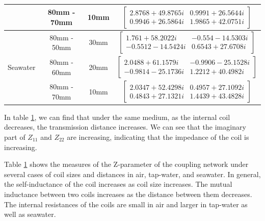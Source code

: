 \begin{table}[!t]
{\begin{tabular}{|c|c|c|c|}
                                   & 80mm - 70mm                        & 10mm              & $\begin{bmatrix} 2.8768	+49.8765i & 0.9991	+26.5644i \\
                0.9946	+26.5864i & 1.9865	+42.0751i\end{bmatrix}$ \Tstrut\Bstrut\\ \hline
        \multirow{3}{*}{Seawater}  & 80mm - 50mm                        & 30mm              & $\begin{bmatrix} 1.761	+58.2022i   & -0.554	-14.5303i \\
                -0.5512	-14.5424i & 0.6543	+27.6708i\end{bmatrix}$ \Tstrut\Bstrut\\ \cline{2-4}
                                   & 80mm - 60mm                        & 20mm              & $\begin{bmatrix} 2.0488	+61.1579i  & -0.9906	-25.1528i \\
                -0.9814	-25.1736i & 1.2212	+40.4982i\end{bmatrix}$ \Tstrut\Bstrut\\ \cline{2-4}
                                   & 80mm - 70mm                        & 10mm              & $\begin{bmatrix} 2.0347	+52.4298i & 0.4957	+27.1092i \\
                0.4843	+27.1321i & 1.4439	+43.4828i\end{bmatrix}$ \Tstrut\Bstrut\\ \hline
    \end{tabular}
    }
    \renewcommand{\arraystretch}{1}
    \label{table:Z-parameters in distance}
\end{table}


In table \ref{table:Z-parameters in distance}, we can find that under the same medium, as the internal coil decreases, the transmission distance increases. We can see that the imaginary part of $Z_{11}$ and $Z_{22}$ are increasing, indicating that the impedance of the coil is increasing.

Table \ref{table:Z-parameters in distance} shows the measures of the Z-parameter of the coupling network under several cases of coil sizes and distances in air, tap-water, and seawater.
In general, the self-inductance of the coil increases as coil size increases.
The mutual inductance between two coils increases as the distance between them decreases.
The internal resistances of the coils are small in air and larger in tap-water as well as seawater.

